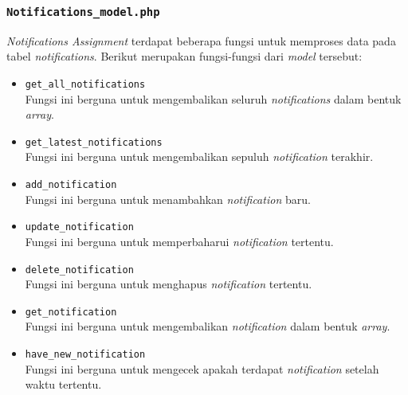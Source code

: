 \subsubsection{\texttt{Notifications\_model.php}}
\textit{Notifications Assignment} terdapat beberapa fungsi untuk memproses data pada tabel \textit{notifications}. Berikut merupakan fungsi-fungsi dari \textit{model} tersebut:
\begin{itemize}
	\item \texttt{get\_all\_notifications}\\
	Fungsi ini berguna untuk mengembalikan seluruh \textit{notifications} dalam bentuk \textit{array}.
	\item \texttt{get\_latest\_notifications}\\
	Fungsi ini berguna untuk mengembalikan sepuluh \textit{notification} terakhir.
	\item \texttt{add\_notification}\\
	Fungsi ini berguna untuk menambahkan \textit{notification} baru.
	\item \texttt{update\_notification}\\
	Fungsi ini berguna untuk memperbaharui \textit{notification} tertentu.
	\item \texttt{delete\_notification}\\
	Fungsi ini berguna untuk menghapus \textit{notification} tertentu.
	\item \texttt{get\_notification}\\
	Fungsi ini berguna untuk mengembalikan \textit{notification} dalam bentuk \textit{array}.
	\item \texttt{have\_new\_notification}\\
	Fungsi ini berguna untuk mengecek apakah terdapat \textit{notification} setelah waktu tertentu.
\end{itemize}
